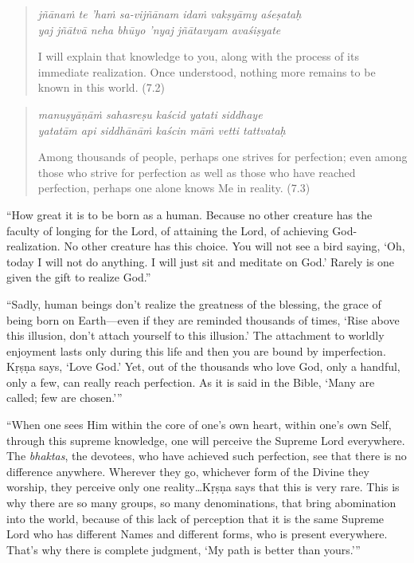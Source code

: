 \documentclass[12pt, twoside, openright]{memoir}
\begin{document}
\par
\begin{verse}
\textit{jñānaṁ te ’haṁ sa-vijñānam idaṁ vakṣyāmy aśeṣataḥ} \\
\textit{yaj jñātvā neha bhūyo ’nyaj jñātavyam avaśiṣyate}

\noindent I will explain that knowledge to you, along with the process of its immediate realization. Once understood, nothing more remains to be known in this world. (7.2)
\end{verse}
\par



\par
\begin{verse}
\textit{manuṣyāṇāṁ sahasreṣu kaścid yatati siddhaye} \\
\textit{yatatām api siddhānāṁ kaścin māṁ vetti tattvataḥ}

\noindent Among thousands of people, perhaps one strives for perfection; even among those who strive for perfection as well as those who have reached perfection, perhaps one alone knows Me in reality. (7.3)
\end{verse}
\par


\enquote{How great it is to be born as a human. Because no other creature has the faculty of longing for the Lord, of attaining the Lord, of achieving God-realization. No other creature has this choice. You will not see a bird saying, \enquote{Oh, today I will not do anything. I will just sit and meditate on God.} Rarely is one given the gift to realize God.}

\enquote{Sadly, human beings don’t realize the greatness of the blessing, the grace of being born on Earth---even if they are reminded thousands of times, \enquote{Rise above this illusion, don’t attach yourself to this illusion.} The attachment to worldly enjoyment lasts only during this life and then you are bound by imperfection. Kṛṣṇa says, \enquote{Love God.} Yet, out of the thousands who love God, only a handful, only a few, can really reach perfection. As it is said in the Bible, \enquote{Many are called; few are chosen.}}

\enquote{When one sees Him within the core of one’s own heart, within one’s own Self, through this supreme knowledge, one will perceive the Supreme Lord everywhere. The \textit{bhaktas}, the devotees, who have achieved such perfection, see that there is no difference anywhere. Wherever they go, whichever form of the Divine they worship, they perceive only one reality\ldots Kṛṣṇa says that this is very rare. This is why there are so many groups, so many denominations, that bring abomination into the world, because of this lack of perception that it is the same Supreme Lord who has different Names and different forms, who is present everywhere. That’s why there is complete judgment, \enquote{My path is better than yours.}}
\end{document}
